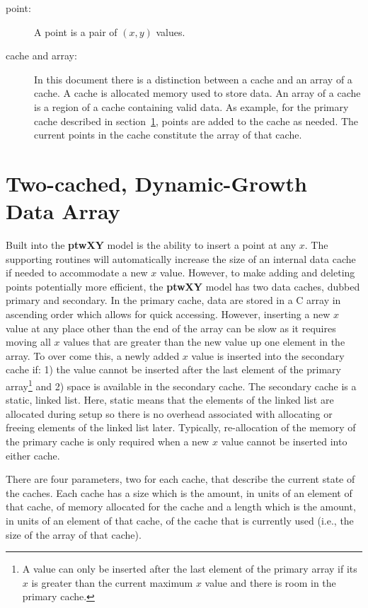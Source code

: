 \documentclass[11pt]{article}
\newcommand{\highlight}[1]{{\bf #1}}
\begin{document}
\begin{description}
    \item[point:] A point is a pair of $(x,y)$ values.
    \item[cache and array:] In this document there is a distinction between a cache and an array of a cache. A cache 
            is allocated memory used to store data. An array of a cache is a region of a cache containing valid data. As example, 
            for the primary cache described in section~\ref{TCDGArray}, points are added to the cache as needed. The current points 
            in the cache constitute the array of that cache.
\end{description}

\section{Two-cached, Dynamic-Growth Data Array} \label{TCDGArray}
Built into the \highlight{ptwXY} model is the ability to insert a point at any $x$. The supporting routines will
automatically increase the size of an internal data cache if needed to accommodate a new $x$ value. However, to make adding
and deleting points potentially more efficient, the \highlight{ptwXY} model has two data caches, dubbed primary and secondary.
In the primary cache, data are stored in a C array in ascending order which allows for quick accessing. However, inserting a new
$x$ value at any place other than the end of the array can be slow as it requires moving all $x$ values that are greater than the new value
up one element in the array.  To over come this, a newly added $x$ value
is inserted into the secondary cache if: 1) the value cannot be inserted after the last element of the primary array\footnote{A value can
only be inserted after the last element of the primary array if its $x$ is greater than the current maximum $x$ value and there is room in
the primary cache.} and 2) space is available in the secondary cache. The secondary cache is a static, linked list. Here, static means that
the elements of the linked list are allocated during setup so there is no overhead associated with allocating or freeing
elements of the linked list later. Typically, re-allocation
of the memory of the primary cache is only required when a new $x$ value cannot be inserted into either cache.

There are four parameters, two for each cache, that describe the current state of the caches. Each cache has a size which is the 
amount, in units of an element of that cache, of memory allocated for the cache and a length which is the amount, in units of an 
element of that cache, of the cache that is currently used (i.e., the size of the array of that cache).
\end{document}
